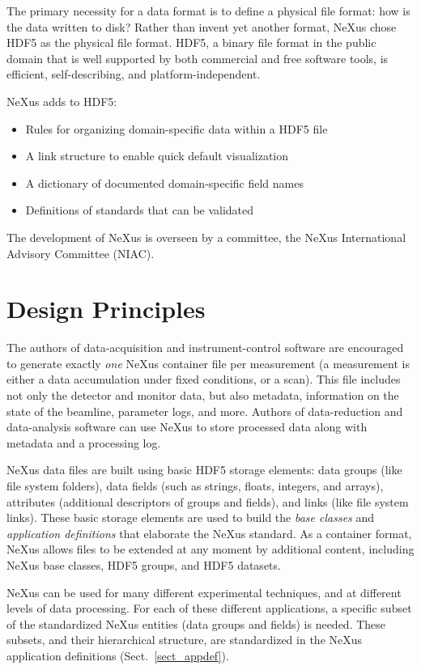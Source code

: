 \documentclass[%
 aip,
rsi,
 amsmath,amssymb,
 reprint,%
]{revtex4-1}
\begin{document}
The primary necessity for a data format is to define a physical file format: how is the data written to disk? Rather than invent
yet another format, NeXus chose HDF5\cite{hdf5} as the physical file format. 
HDF5, a binary file format in the public domain that is well supported by both commercial and free software tools, 
is efficient, self-describing, and platform-independent.

NeXus adds to HDF5:
\begin{itemize}
\item Rules for organizing domain-specific data within a HDF5 file
\item A link structure to enable quick default visualization
\item A dictionary of documented domain-specific field names
\item Definitions of standards that can be validated
\end{itemize}

The development of NeXus is overseen by a committee, the NeXus International Advisory Committee (NIAC)\cite{niac}.

\section{Design Principles}

The authors of data-acquisition and instrument-control software are encouraged to generate exactly \emph{one} NeXus container file per measurement
(a measurement is either a data accumulation under fixed conditions,
or a scan).
This file includes not only the detector and monitor data,
but also metadata, information on the state of the beamline, parameter logs, and more.
Authors of data-reduction and data-analysis software can use NeXus to
store processed data along with metadata and a processing log.

NeXus data files are built using basic HDF5 storage elements: 
data groups (like file system folders), 
data fields (such as strings, floats, integers, and arrays), 
attributes (additional descriptors of groups and fields), 
and links (like file system links).  These basic storage elements are used to
build the \emph{base classes} and \emph{application definitions}
that elaborate the NeXus standard.
As a container format, NeXus allows files to be extended at any moment by
additional content, including NeXus base classes, HDF5 groups, and HDF5 datasets.

NeXus can be used for many different experimental techniques,
and at different levels of data processing.
For each of these different applications,
a specific subset of the standardized NeXus entities 
(data groups and fields) is needed.
These subsets, and their hierarchical structure, are standardized
in the NeXus application definitions (Sect.~\ref{sect_appdef}).
\end{document}
